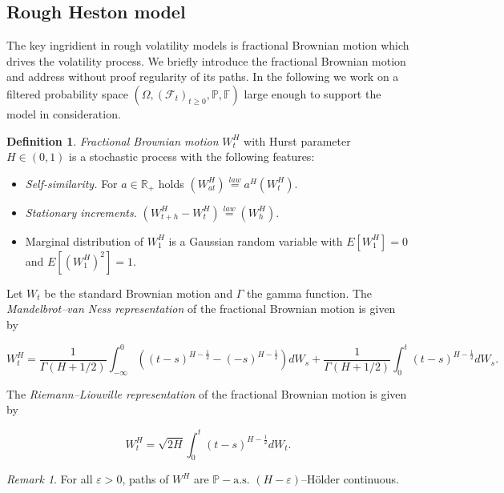 \documentclass[12pt,twoside]{article}
\theoremstyle{plain}
\theoremstyle{plain}
\theoremstyle{definition}
\newtheorem{definition}[proposition]{Definition}
\theoremstyle{remark}
\newtheorem{remark}[proposition]{Remark}
\numberwithin{equation}{section}
\begin{document}
\subsection{Rough Heston model}
\label{sec: introduction rough heston model}

The key ingridient in rough volatility models is fractional Brownian motion which drives the volatility process. We briefly introduce the fractional Brownian motion and address without proof regularity of its paths. In the following we work on a filtered probability space $(\Omega, (\mathcal F_t)_{t\geq 0}, \mathbb P, \mathbb F)$ large enough to support the model in consideration.

\begin{definition}

\emph{Fractional Brownian motion} $W^H_t$ with Hurst parameter $H\in (0, 1)$ is a stochastic process with the following features:

\begin{itemize}
    \item \emph{Self-similarity.} For $a\in \mathbb R_+$ holds $\left(W_{a t}^{H}\right) \overset{law}{=} a^{H}\left(W_{t}^{H}\right)$.
    \item \emph{Stationary increments.} $\left(W_{t+h}^{H}-W_{t}^{H}\right) \overset{law}{=} \left(W_{h}^{H}\right)$.
    \item Marginal distribution of $W^H_1$ is a Gaussian random variable with $E \left[W^H_1\right] = 0$ and $E\left[(W^H_1)^2\right]=1$.
\end{itemize}

Let $W_t$ be the standard Brownian motion and $\Gamma$ the gamma function. The \emph{Mandelbrot–van Ness representation} of the fractional Brownian motion is given by

$$
W_{t}^{H}=\frac{1}{\Gamma(H+1 / 2)} \int_{-\infty}^{0}\left((t-s)^{H-\frac{1}{2}}-(-s)^{H-\frac{1}{2}}\right) d W_{s}+\frac{1}{\Gamma(H+1 / 2)} \int_{0}^{t}(t-s)^{H-\frac{1}{2}} d W_s.
$$

The \emph{Riemann–Liouville representation} of the fractional Brownian motion is given by

$$
W^H_t = \sqrt{2H} \int _0^t(t-s)^{H-\frac 12} dW_t.
$$

\vspace{5pt}

\end{definition}

\begin{remark}
For all $\varepsilon > 0$, paths of $W^H$ are $\mathbb P-\text{a.s.}$ $(H-\varepsilon)$–Hölder continuous.
\end{remark}
\end{document}
